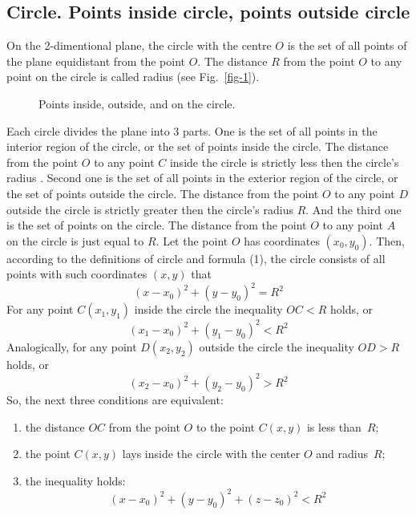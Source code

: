 \documentclass{article}
\begin{document}
\subsection{Circle. Points inside circle, points outside circle} %

On the 2-dimentional plane, the circle with the centre $O$ is the set of all points of the plane equidistant from the point $O$.
The distance $R$ from the point $O$ to any point on the circle is called radius (see Fig.~\ref{fig-1}).
\begin{figure}
  \centering
  \def\svgwidth{\columnwidth}
%  
\caption{Points inside, outside, and on the circle.}
\label{fig-4}
\end{figure}
%
Each circle divides the plane into 3 parts.
One is the set of all points in the interior region of the circle, or the set of points inside the circle.
The distance from the point $O$ to any point $C$ inside the circle is strictly less then the circle’s radius     .
Second one is the set of all points in the exterior region of the circle, or the set of points outside the circle.
The distance from the point $O$ to any point $D$ outside the circle is strictly greater then the circle’s radius $R$.
And the third one is the set of points on the circle.
The distance from the point $O$ to any point $A$ on the circle is just equal to $R$.
Let the point $O$ has coordinates $(x_0, y_0)$.
Then, according to the definitions of circle and formula (1), the circle consists of all points with such coordinates $(x, y)$ that
\begin{equation}
  (x - x_0)^2 + (y - y_0)^2 = R^2
\end{equation}
For any point $C(x_1, y_1)$ inside the circle the inequality $OC < R$ holds, or
\begin{equation}
  (x_1 - x_0)^2 + (y_1 - y_0)^2 < R^2
\end{equation}
Analogically, for any point $D(x_2, y_2)$ outside the circle the inequality $OD > R$ holds, or
\begin{equation}
  (x_2 - x_0)^2 + (y_2 - y_0)^2 > R^2
\end{equation}
So, the next three conditions are equivalent:
\begin{enumerate}
\item
the distance $OC$ from the point $O$ to the point $C(x, y)$ is less than~$R$;
\item
the point $C(x, y)$ lays inside the circle with the center $O$ and radius~$R$;
\item
the inequality holds:
\begin{equation}
  (x - x_0)^2 + (y - y_0)^2 + (z - z_0)^2 < R^2
\end{equation}
\end{enumerate}
\end{document}
